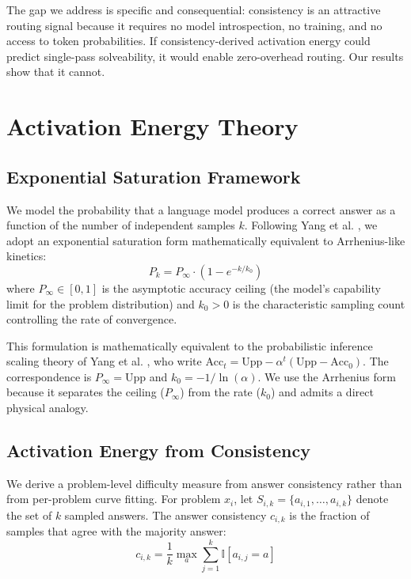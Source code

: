 \documentclass{article}
\begin{document}
The gap we address is specific and consequential: consistency is an attractive routing signal because it requires no model introspection, no training, and no access to token probabilities. If consistency-derived activation energy could predict single-pass solveability, it would enable zero-overhead routing. Our results show that it cannot.

\section{Activation Energy Theory}
\label{sec:theory}

\subsection{Exponential Saturation Framework}

We model the probability that a language model produces a correct answer as a function of the number of independent samples $k$. Following Yang et al. \citep{yang2024probabilistic}, we adopt an exponential saturation form mathematically equivalent to Arrhenius-like kinetics:
\begin{equation}
P_k = P_\infty \cdot \left(1 - e^{-k / k_0}\right)
\end{equation}
where $P_\infty \in [0, 1]$ is the asymptotic accuracy ceiling (the model's capability limit for the problem distribution) and $k_0 > 0$ is the characteristic sampling count controlling the rate of convergence.

This formulation is mathematically equivalent to the probabilistic inference scaling theory of Yang et al. \citep{yang2024probabilistic}, who write $\text{Acc}_t = \text{Upp} - \alpha^t (\text{Upp} - \text{Acc}_0)$. The correspondence is $P_\infty = \text{Upp}$ and $k_0 = -1 / \ln(\alpha)$. We use the Arrhenius form because it separates the ceiling ($P_\infty$) from the rate ($k_0$) and admits a direct physical analogy.

\subsection{Activation Energy from Consistency}

We derive a problem-level difficulty measure from answer consistency rather than from per-problem curve fitting. For problem $x_i$, let $S_{i,k} = \{a_{i,1}, \ldots, a_{i,k}\}$ denote the set of $k$ sampled answers. The answer consistency $c_{i,k}$ is the fraction of samples that agree with the majority answer:
\begin{equation}
c_{i,k} = \frac{1}{k} \max_{a} \sum_{j=1}^{k} \mathbb{I}[a_{i,j} = a]
\end{equation}
\end{document}
